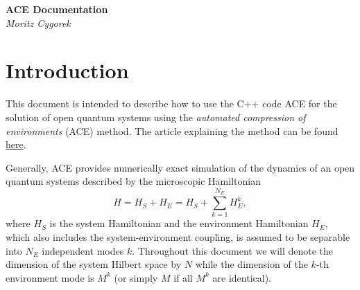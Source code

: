 \documentclass{scrartcl}
\begin{document}
\begin{center}
\textbf{\LARGE ACE Documentation}\\[2mm]
\textit{\Large Moritz Cygorek}
\end{center}
\section{Introduction}
This document is intended to describe how to use the C++ code ACE
for the solution of open quantum systems using the 
\emph{automated compression of environments} (ACE) method.
The article explaining the method can be found 
\href{https://arxiv.org/abs/2101.01653}{here}.

Generally, ACE provides numerically exact simulation of the dynamics of 
an open quantum systems described by the microscopic Hamiltonian 
\begin{equation}
H=H_S+H_E = H_S +\sum_{k=1}^{N_E} H_E^k,
\end{equation}
where $H_S$ is the system Hamiltonian and the environment Hamiltonian $H_E$,
which also includes the system-environment coupling, is assumed to be 
separable into $N_E$ independent modes $k$. 
Throughout this document we will denote the dimension of the system Hilbert
space by $N$ while the dimension of the $k$-th environment mode
is $M^k$ (or simply $M$ if all $M^k$ are identical).
\end{document}
